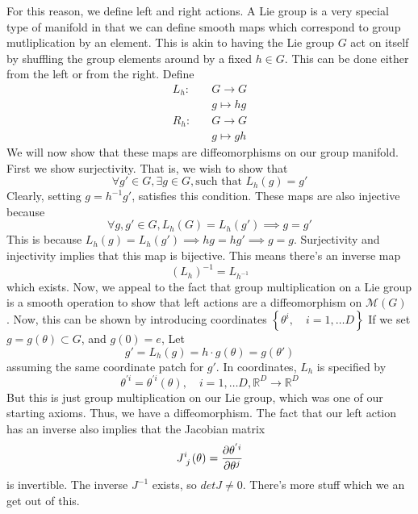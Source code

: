 \documentclass[11pt, oneside]{article}   	%
\theoremstyle{slanted}
\begin{document}
For this reason, we define left and right actions. A Lie group is a very special type 
of manifold in that we
can define smooth maps which 
correspond to group mutliplication by an element. 
This is akin to having the Lie group $G$ act on itself by shuffling the group elements around by a fixed $h \in G$. This can be done either from the left or from the right. Define 
\begin{align*} 
	L_h: \quad & G \rightarrow G \\
	&	g \mapsto hg \\
	R_h: \quad & G \rightarrow G \\
	& g \mapsto gh
\end{align*}
We will now show that these maps are diffeomorphisms on our group manifold. 
First we show surjectivity. That is, we wish to show that 
\[
	\forall g' \in G, \exists g \in G , \text{such that } L_h ( g )  = g'  
\] Clearly, setting $ g = h ^ { -1 } g '$, satisfies this condition. 
These maps are also injective because
 \[
 \forall g , g' \in G, L_h( G ) = L _ h  ( g' ) \implies g = g' 
\] This is because $ L_h ( g) = L _ h ( g ' ) \implies hg = hg' \implies g = g $. 
Surjectivity and injectivity implies that this map is bijective. This means there's
an inverse map 
 \[
	 ( L _ h ) ^ { - 1}  = L _{ h ^ { - 1} }
\] which exists. Now, we appeal to the fact 
that group multiplication on a Lie group is a smooth operation 
to show that left actions are a diffeomorphism on $ \mathcal{ M }( G  ) $ . 
Now, this can be shown by introducing coordinates $ \left\{  \theta ^ i, \quad i = 1 , \dots D   \right\}  $ 
If we set $ g = g ( \theta ) \subset G $, and $ g ( 0 ) = e $, 
Let 
 \[
	 g ' = L_h ( g ) = h \cdot  g ( \theta ) = g ( \theta' ) 
\] assuming the same coordinate patch for $ g ' $. 
In coordinates,  $ L_ h$ is specified by
\[
	\theta^{ ' i  } = \theta ^{ 'i } ( \theta) , \quad i = 1, \dots D , \mathbb{ R} ^ D \to \mathbb{ R} ^  D
\] But this is just group multiplication 
on our Lie group, which was one of our starting 
axioms. Thus, we have a diffeomorphism. 
The fact that our left action has an inverse also implies 
that the Jacobian matrix 
\[
J \indices{ ^ i _ j } ( \theta)  = \frac{\partial \theta ^{ ' i } }{\partial \theta ^  j }  
\] is invertible. The inverse $ J ^ { -1 } $ exists, so $ det J \neq 0 $. 
There's more stuff which we an get out of this. 
\end{document}
